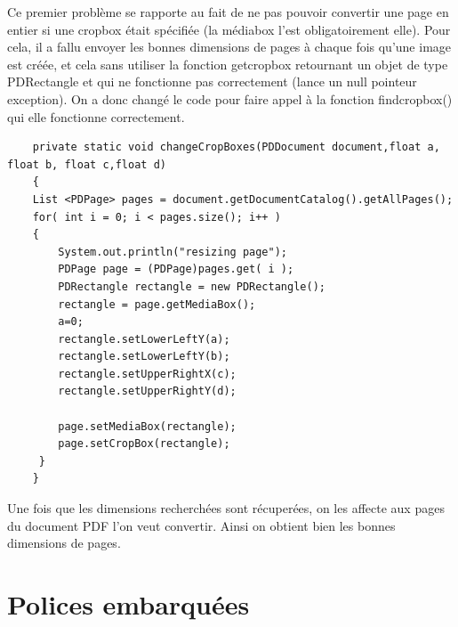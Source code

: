 Ce premier problème se rapporte au fait de ne pas pouvoir convertir
une page en entier si une cropbox était spécifiée (la médiabox l'est 
obligatoirement elle). Pour cela, il a fallu envoyer les bonnes dimensions 
de pages à chaque fois qu'une image est créée, et cela sans utiliser la fonction
getcropbox retournant un objet de type PDRectangle et qui ne fonctionne 
pas correctement (lance un null pointeur exception). On a donc changé le
code pour faire appel à la fonction findcropbox() qui elle fonctionne 
    correctement.


    \lstset{language=Java}
    \begin{lstlisting} 
    private static void changeCropBoxes(PDDocument document,float a, float b, float c,float d)
    {
	List <PDPage> pages = document.getDocumentCatalog().getAllPages();
	for( int i = 0; i < pages.size(); i++ )
	{
        System.out.println("resizing page");
        PDPage page = (PDPage)pages.get( i );
        PDRectangle rectangle = new PDRectangle();
        rectangle = page.getMediaBox();
        a=0;
        rectangle.setLowerLeftY(a);
        rectangle.setLowerLeftY(b);
        rectangle.setUpperRightX(c);
        rectangle.setUpperRightY(d);

        page.setMediaBox(rectangle);
        page.setCropBox(rectangle);
	 }
    }
    \end{lstlisting}

Une fois que les dimensions recherchées sont récuperées, on les affecte
aux pages du document PDF l'on veut convertir. Ainsi on obtient bien les bonnes 
dimensions de pages.

    \section{Polices embarquées}


